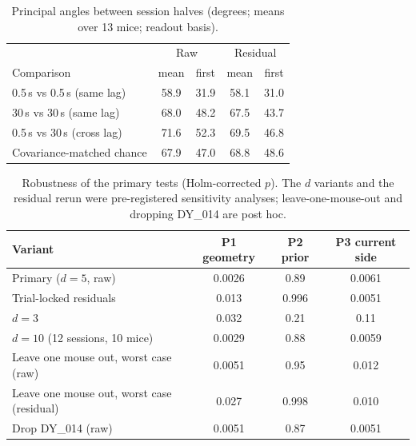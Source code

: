 \documentclass{article}
\begin{document}
\begin{table}[H]
  \caption{Principal angles between session halves (degrees; means over 13 mice; readout basis).}
  \label{tab:angles}
  \centering\small
  \begin{tabular}{lcccc}
    \toprule
     & \multicolumn{2}{c}{Raw} & \multicolumn{2}{c}{Residual} \\
    Comparison & mean & first & mean & first \\
    \midrule
    0.5\,s vs 0.5\,s (same lag)         & 58.9 & 31.9 & 58.1 & 31.0 \\
    30\,s vs 30\,s (same lag)           & 68.0 & 48.2 & 67.5 & 43.7 \\
    0.5\,s vs 30\,s (cross lag)         & 71.6 & 52.3 & 69.5 & 46.8 \\
    Covariance-matched chance           & 67.9 & 47.0 & 68.8 & 48.6 \\
    \bottomrule
  \end{tabular}
\end{table}

\begin{table}[H]
  \caption{Robustness of the primary tests (Holm-corrected $p$). The $d$ variants and the residual rerun were
  pre-registered sensitivity analyses; leave-one-mouse-out and dropping DY\_014 are post hoc.}
  \label{tab:robust}
  \centering\small
  \begin{tabular}{lccc}
    \toprule
    Variant & P1 geometry & P2 prior & P3 current side \\
    \midrule
    Primary ($d=5$, raw)                         & 0.0026 & 0.89  & 0.0061 \\
    Trial-locked residuals                       & 0.013  & 0.996 & 0.0051 \\
    $d=3$                                        & 0.032  & 0.21  & 0.11   \\
    $d=10$ (12 sessions, 10 mice)                & 0.0029 & 0.88  & 0.0059 \\
    Leave one mouse out, worst case (raw)        & 0.0051 & 0.95  & 0.012  \\
    Leave one mouse out, worst case (residual)   & 0.027  & 0.998 & 0.010  \\
    Drop DY\_014 (raw)                           & 0.0051 & 0.87  & 0.0051 \\
    \bottomrule
  \end{tabular}
\end{table}
\end{document}
